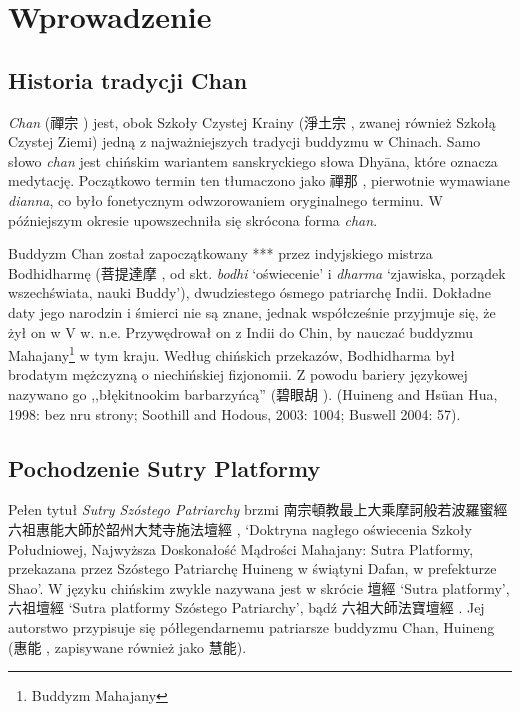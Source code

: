 \maketitle
\section{Wprowadzenie}
\subsection{Historia tradycji Chan}
\emph{Chan} (禪宗 ) jest, obok Szkoły Czystej Krainy (淨土宗 , zwanej również Szkołą Czystej Ziemi) jedną z najważniejszych tradycji buddyzmu w Chinach. Samo słowo \emph{chan} jest chińskim wariantem %
sanskryckiego słowa Dhyāna, które oznacza medytację. %
Początkowo termin ten tłumaczono jako 禪那 , pierwotnie wymawiane \emph{dianna}, co było fonetycznym odwzorowaniem oryginalnego terminu. W późniejszym okresie upowszechniła się skrócona forma \emph{chan}.

Buddyzm Chan został zapoczątkowany *** przez indyjskiego mistrza Bodhidharmę (菩提達摩 , od skt. \emph{bodhi} `oświecenie' i \emph{dharma} `zjawiska, porządek wszechświata, nauki Buddy'), dwudziestego ósmego patriarchę Indii. Dokładne daty jego narodzin i śmierci nie są znane, jednak współcześnie przyjmuje się, że żył on w V w. n.e. Przywędrował on z Indii do Chin, by nauczać buddyzmu Mahajany\footnote{Buddyzm Mahajany} w tym kraju. Według chińskich przekazów, Bodhidharma był brodatym mężczyzną o niechińskiej fizjonomii. Z powodu bariery językowej nazywano go ,,błękitnookim barbarzyńcą'' (碧眼胡 ). (Huineng and Hsüan Hua, 1998: bez nru strony; Soothill and Hodous, 2003: 1004; Buswell 2004: 57).

\subsection{Pochodzenie Sutry Platformy}

Pełen tytuł \emph{Sutry Szóstego Patriarchy} brzmi 南宗頓教最上大乘摩訶般若波羅蜜經六祖惠能大師於韶州大梵寺施法壇經 , `Doktryna nagłego oświecenia Szkoły Południowej, Najwyższa Doskonałość Mądrości Mahajany: Sutra Platformy, przekazana przez Szóstego Patriarchę Huineng w świątyni Dafan, w prefekturze Shao'. W języku chińskim zwykle nazywana jest w skrócie 壇經  `Sutra platformy', 六祖壇經  `Sutra platformy Szóstego Patriarchy', bądź 六祖大師法寶壇經 . Jej autorstwo przypisuje się półlegendarnemu patriarsze buddyzmu Chan, Huineng (惠能 , zapisywane również jako 慧能). %

